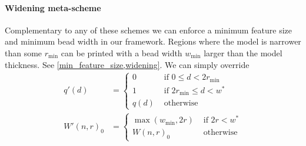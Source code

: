 \paragraph{Widening {meta-scheme}}
Complementary to any of these schemes we can enforce a minimum feature size {and minimum bead width} in our framework.
Regions where the model is narrower than {some $r_\text{min}$} can be printed with a bead width {$w_\text{min}$} larger than the model thickness.
See \cref{min_feature_size,widening}.
We can simply override
\begin{align*}
q'(d) &= 
\begin{cases}
0 & \text{ if } 0 \leq d < 2 r_\text{min} \\
1 & \text{ if }  2 r_\text{min} \leq d < w^*  \\
q(d) & \text{ otherwise}
\end{cases}
\\
W'(n,r)_0 &=
\begin{cases}
\max \left( w_\text{min}  ,  2 r \right) & \text{ if } 2 r < w^* \\
W(n,r)_0 & \text{ otherwise}
\end{cases}
\end{align*}



